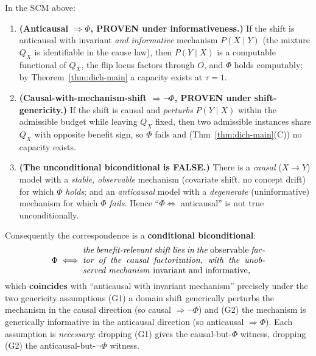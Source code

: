 \begin{theorem}
\label{thm:dich-causal}
In the SCM above:
\begin{enumerate}\itemsep2pt
\item[\textnormal{(i)}] \textbf{(Anticausal $\Rightarrow\Phi$, PROVEN under
informativeness.)} If the shift is anticausal with invariant \emph{and informative}
mechanism $P(X\mid Y)$ (the mixture $Q_X$ is identifiable in the cause law), then
$P(Y\mid X)$ is a computable functional of $Q_X$, the flip locus factors through $O$,
and $\Phi$ holds computably; by Theorem~\ref{thm:dich-main} a capacity exists at
$\tau=1$.
\item[\textnormal{(ii)}] \textbf{(Causal-with-mechanism-shift $\Rightarrow\neg\Phi$,
PROVEN under shift-genericity.)} If the shift is causal and \emph{perturbs} $P(Y\mid X)$
within the admissible budget while leaving $Q_X$ fixed, then two admissible instances
share $Q_X$ with opposite benefit sign, so $\Phi$ fails and (Thm~\ref{thm:dich-main}(C))
no capacity exists.
\item[\textnormal{(iii)}] \textbf{(The unconditional biconditional is FALSE.)} There is
a \emph{causal} ($X\to Y$) model with a \emph{stable, observable} mechanism (covariate
shift, no concept drift) for which $\Phi$ \emph{holds}; and an \emph{anticausal} model
with a \emph{degenerate} (uninformative) mechanism for which $\Phi$ \emph{fails}. Hence
``$\Phi\iff$ anticausal'' is not true unconditionally.
\end{enumerate}
Consequently the correspondence is a \textbf{conditional biconditional}:
\[
  \Phi \iff
  \begin{minipage}{0.62\linewidth}\itshape the benefit-relevant shift lies in the
  \emph{observable} factor of the causal factorization, with the unobserved mechanism
  \emph{invariant and informative},\end{minipage}
\]
which \textbf{coincides} with ``anticausal with invariant mechanism'' precisely under
the two genericity assumptions \textnormal{(G1)} a domain shift generically perturbs the
mechanism in the causal direction (so causal $\Rightarrow\neg\Phi$) and \textnormal{(G2)}
the mechanism is generically informative in the anticausal direction (so anticausal
$\Rightarrow\Phi$). Each assumption is \emph{necessary}: dropping (G1) gives the
causal-but-$\Phi$ witness, dropping (G2) the anticausal-but-$\neg\Phi$ witness.
\end{theorem}

